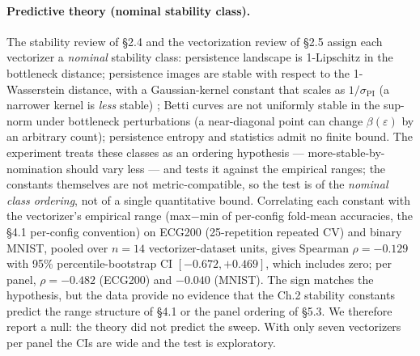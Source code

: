 \documentclass[12pt, a4paper]{report}
\theoremstyle{definition}
\theoremstyle{plain}
\theoremstyle{remark}
\begin{document}
\paragraph{Predictive theory (nominal stability class).} The
stability review of \S2.4 and the vectorization review of \S2.5
assign each vectorizer a \emph{nominal} stability class: persistence
landscape is 1-Lipschitz in the bottleneck distance; persistence
images are stable with respect to the 1-Wasserstein distance, with a
Gaussian-kernel constant that scales as $1/\sigma_{\mathrm{PI}}$ (a
narrower kernel is \emph{less} stable) \cite{adams2017}; Betti curves
are not uniformly stable in the sup-norm under bottleneck
perturbations (a near-diagonal point can change $\beta(\varepsilon)$
by an arbitrary count); persistence entropy and statistics admit no
finite bound. The experiment treats these classes as an ordering
hypothesis --- more-stable-by-nomination should vary less --- and
tests it against the empirical ranges; the constants themselves are
not metric-compatible, so the test is of the \emph{nominal class
ordering}, not of a single quantitative bound.
Correlating each constant with the vectorizer's empirical range
(max$-$min of per-config fold-mean accuracies, the \S4.1 per-config
convention) on ECG200 (25-repetition repeated CV) and binary MNIST,
pooled over $n{=}14$ vectorizer-dataset units, gives Spearman
$\rho = -0.129$ with 95\% percentile-bootstrap CI $[-0.672, +0.469]$,
which includes zero; per panel, $\rho = -0.482$ (ECG200) and $-0.040$
(MNIST). The sign matches the hypothesis, but the data provide no
evidence that the Ch.2 stability constants predict the range structure
of \S4.1 or the panel ordering of \S5.3. We therefore report a null:
the theory did not predict the sweep. With only seven vectorizers per
panel the CIs are wide and the test is exploratory.
\end{document}
